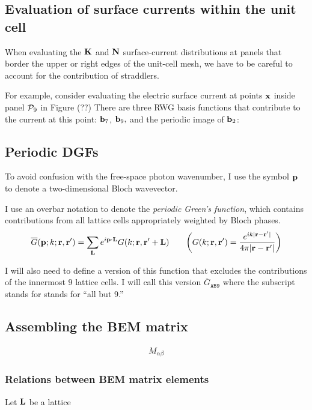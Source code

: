 \documentclass[letterpaper]{article}
\newcommand{\GBar}{\overline{G}}
\begin{document}
\subsection{Evaluation of surface currents within the unit cell}

When evaluating the $\mathbf{K}$ and $\mathbf{N}$ surface-current 
distributions at panels that border the upper or right edges 
of the unit-cell mesh, we have to be careful to account for the 
contribution of straddlers. 

For example, consider evaluating the electric surface current at 
points $\mathbf{x}$ inside panel $\mathcal{P}_9$ in Figure (??) %
There are three RWG basis functions that contribute to the current
at this point: $\mathbf{b}_7$, $\mathbf{b}_9,$ and the periodic image of 
$\mathbf{b}_2$:

\subsection{Periodic DGFs}

To avoid confusion with the free-space photon wavenumber, 
I use the symbol $\mathbf{p}$ to denote a two-dimensional 
Bloch wavevector.

I use an overbar notation to denote the 
\textit{periodic Green's function}, which contains contributions
from all lattice cells appropriately weighted by Bloch phases.
$$
  \GBar(\vb p; k; \vb r, \vb r^\prime)
= \sum_{\vb L} e^{i \vb p \cdot \vb L} G(k; \vb r, \vb r^\prime+\vb L)
\qquad 
 \bigg( G(k; \vb r, \vb r^\prime) 
 = \frac{e^{ik|\vb r-\vb r^\prime|}}{4\pi|\vb r-\vb r^\prime|}
 \bigg)
$$

I will also need to define a version of this function that 
excludes the contributions of the innermost 9 lattice cells.
I will call this version 
$\GBar_{\texttt{AB9}}$
where the subscript stands for 
stands for ``all but 9.''

\subsection{Assembling the BEM matrix}

\begin{align*}
M_{\alpha\beta}
\end{align*}

\subsubsection{Relations between BEM matrix elements}

Let $\mathbf{L}$ be a lattice 
\end{document}
